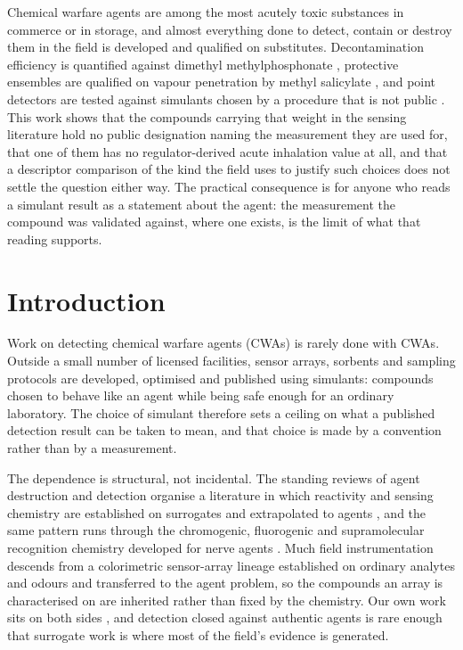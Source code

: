 \documentclass[1p,times]{elsarticle}
\begin{document}
Chemical warfare agents are
among the most acutely toxic substances in commerce or in storage, and almost
everything done to detect, contain or destroy them in the field is developed and
qualified on substitutes. Decontamination efficiency is quantified against
dimethyl methylphosphonate \cite{ebeam}, protective ensembles are qualified on
vapour penetration by methyl salicylate \cite{nrc1997mist, astmf2588,
top102022a}, and point detectors are tested against simulants chosen by a
procedure that is not public \cite{top082188, top082196}. This work shows that
the compounds carrying that weight in the sensing literature hold no public
designation naming the measurement they are used for, that one of them has no
regulator-derived acute inhalation value at all, and that a descriptor
comparison of the kind the field uses to justify such choices does not settle
the question either way. The practical consequence is for anyone who reads a
simulant result as a statement about the agent: the measurement the compound was
validated against, where one exists, is the limit of what that reading supports.

\section{Introduction}

Work on detecting chemical warfare agents (CWAs) is rarely done with CWAs.
Outside a small number of licensed facilities, sensor arrays, sorbents and
sampling protocols are developed, optimised and published using simulants:
compounds chosen to behave like an agent while being safe enough for an ordinary
laboratory. The choice of simulant therefore sets a ceiling on what a published
detection result can be taken to mean, and that choice is made by a convention
rather than by a measurement.

The dependence is structural, not incidental. The standing reviews of agent
destruction and detection organise a literature in which reactivity and sensing
chemistry are established on surrogates and extrapolated to agents
\cite{kim2011,jang2015}, and the same pattern runs through the chromogenic,
fluorogenic and supramolecular recognition chemistry developed for nerve agents
\cite{royo2007,sambrook2013,eubanks2007}. Much field instrumentation descends
from a colorimetric sensor-array lineage established on ordinary analytes and
odours \cite{rakow2000,lin2011,askim2013} and transferred to the agent problem,
so the compounds an array is characterised on are inherited rather than fixed by
the chemistry. Our own work sits on both sides
\cite{hazref,multiplexref,ondeviceref,group3ref}, and detection closed against authentic
agents is rare enough that surrogate work is where most of the field's evidence
is generated.
\end{document}
